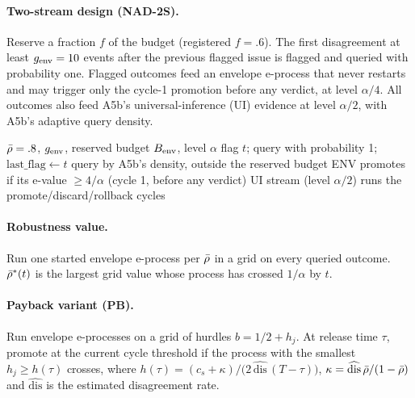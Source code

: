 \paragraph{Two-stream design (NAD-2S).} Reserve a fraction $f$ of the budget (registered $f=.6$). The
first disagreement at least $g_{\rm env}=10$ events after the previous flagged issue is flagged and
queried with probability one. Flagged outcomes feed an envelope e-process that never restarts and may
trigger only the cycle-1 promotion before any verdict, at level $\alpha/4$. All outcomes also feed
A5b's universal-inference (UI) evidence \citep{wasserman2020universal} at level $\alpha/2$, with A5b's
adaptive query density.

\begin{algorithm}[tb]
\caption{NAD-2S flagging and promotion}\label{alg:twostream}
\begin{algorithmic}
 $\bar\rho=.8$, $g_{\rm env}$, reserved budget $B_{\rm env}$, level $\alpha$
    \STATE flag $t$; query with probability 1; $\text{last\_flag}\gets t$
  \ELSE \STATE query by A5b's density, outside the reserved budget
  \ENDIF
\ENDFOR
\STATE ENV promotes if its e-value $\ge 4/\alpha$ (cycle 1, before any verdict)
\STATE UI stream (level $\alpha/2$) runs the promote/discard/rollback cycles
\end{algorithmic}
\end{algorithm}

\paragraph{Robustness value.} Run one started envelope e-process per $\bar\rho$ in a grid on every
queried outcome. $\bar\rho^*(t)$ is the largest grid value whose process has crossed $1/\alpha$ by $t$.

\paragraph{Payback variant (PB).} Run envelope e-processes on a grid of hurdles $b=1/2+h_j$. At release
time $\tau$, promote at the current cycle threshold if the process with the smallest $h_j\ge h(\tau)$
crosses, where $h(\tau)=(c_s+\kappa)/\big(2\,\widehat{\mathrm{dis}}\,(T-\tau)\big)$,
$\kappa=\widehat{\mathrm{dis}}\,\bar\rho/(1-\bar\rho)$ and $\widehat{\mathrm{dis}}$ is the estimated
disagreement rate.
